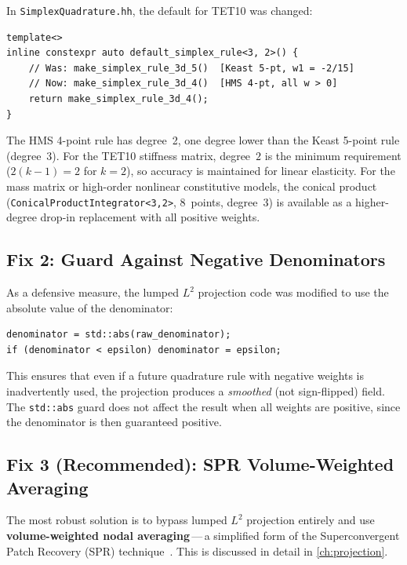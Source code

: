 In \texttt{SimplexQuadrature.hh}, the default for TET10 was changed:
\begin{lstlisting}
template<>
inline constexpr auto default_simplex_rule<3, 2>() {
    // Was: make_simplex_rule_3d_5()  [Keast 5-pt, w1 = -2/15]
    // Now: make_simplex_rule_3d_4()  [HMS 4-pt, all w > 0]
    return make_simplex_rule_3d_4();
}
\end{lstlisting}

\begin{remark}
The HMS 4-point rule has degree~2, one degree lower than the Keast 5-point
rule (degree~3).  For the TET10 stiffness matrix, degree~$2$ is the minimum
requirement ($2(k-1) = 2$ for $k=2$), so accuracy is maintained for linear
elasticity.  For the mass matrix or high-order nonlinear constitutive models,
the conical product (\texttt{ConicalProductIntegrator<3,2>}, 8~points, degree~3)
is available as a higher-degree drop-in replacement with all positive weights.
\end{remark}

\subsection{Fix 2: Guard Against Negative Denominators}

As a defensive measure, the lumped $L^2$ projection code was modified to use
the absolute value of the denominator:
\begin{lstlisting}
denominator = std::abs(raw_denominator);
if (denominator < epsilon) denominator = epsilon;
\end{lstlisting}

This ensures that even if a future quadrature rule with negative weights is
inadvertently used, the projection produces a \emph{smoothed} (not
sign-flipped) field.  The \texttt{std::abs} guard does not affect the result
when all weights are positive, since the denominator is then guaranteed
positive.

\subsection{Fix 3 (Recommended): SPR Volume-Weighted Averaging}

The most robust solution is to bypass lumped $L^2$ projection entirely and use
\textbf{volume-weighted nodal averaging}\,---\,a simplified form of the
Superconvergent Patch Recovery (SPR) technique~\cite{ZienkiewiczZhu1992a}.
This is discussed in detail in \cref{ch:projection}.


